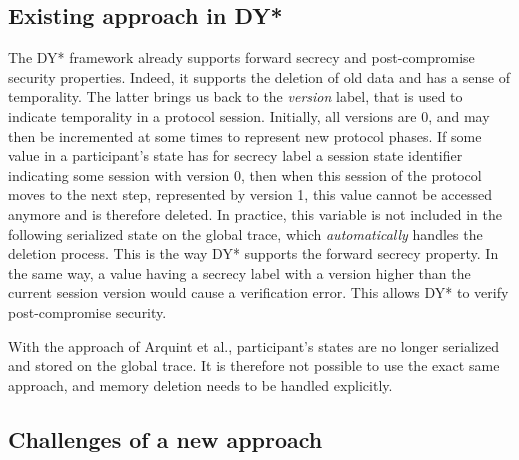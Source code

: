 \documentclass{article}
\begin{document}

\subsection{Existing approach in DY*}
\label{sec:existing-approach-dy}

The DY* framework already supports forward secrecy and post-compromise security properties. Indeed, it supports the deletion of old data and has a sense of temporality.
The latter brings us back to the \textit{version} label, that is used to indicate temporality in a protocol session. Initially, all versions are 0, and may then be incremented at some times to represent new protocol phases. 
If some value in a participant's state has for secrecy label a session state identifier indicating some session with version 0, then when this session of the protocol moves to the next step, represented by version 1, this value cannot be accessed anymore and is therefore deleted.
In practice, this variable is not included in the following serialized state on the global trace, which \textit{automatically} handles the deletion process. This is the way DY* supports the forward secrecy property.
In the same way, a value having a secrecy label with a version higher than the current session version would cause a verification error. This allows DY* to verify post-compromise security.

With the approach of Arquint et al., participant's states are no longer serialized and stored on the global trace. It is therefore not possible to use the exact same approach, and memory deletion needs to be handled explicitly.


\subsection{Challenges of a new approach}
\end{document}
